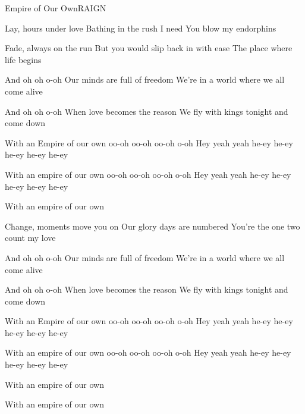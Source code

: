 \documentclass[a4paper,11pt,french]{article}
\begin{document}
\begin{Song}{Empire of Our Own}{RAIGN}
\begin{multicols}{2}

\begin{Verse}
Lay, hours under love
Bathing in the rush I need
You blow my endorphins
\espaceInterStrophe

Fade, always on the run
But you would slip back in with ease
The place where life begins
\end{Verse}
\espaceInterStrophe

\begin{PreChorus}
And oh oh o-oh
Our minds are full of freedom
We're in a world where we all come alive
\espaceInterStrophe

And oh oh o-oh
When love becomes the reason
We fly with kings tonight and come down
\end{PreChorus}
\espaceInterStrophe

\begin{Chorus}
With an Empire of our own
oo-oh oo-oh oo-oh o-oh 
Hey yeah yeah
he-ey he-ey he-ey he-ey he-ey 
\espaceInterStrophe

With an empire of our own
oo-oh oo-oh oo-oh o-oh 
Hey yeah yeah
he-ey he-ey he-ey he-ey he-ey
\espaceInterStrophe

With an empire of our own
\end{Chorus}
\columnbreak

\begin{Verse}
Change, moments move you on
Our glory days are numbered
You're the one two count my love
\end{Verse}
\espaceInterStrophe

\begin{PreChorus}
And oh oh o-oh
Our minds are full of freedom
We're in a world where we all come alive
\espaceInterStrophe

And oh oh o-oh
When love becomes the reason
We fly with kings tonight and come down
\end{PreChorus}
\espaceInterStrophe

\begin{Chorus}
With an Empire of our own
oo-oh oo-oh oo-oh o-oh 
Hey yeah yeah
he-ey he-ey he-ey he-ey he-ey 
\espaceInterStrophe

With an empire of our own
oo-oh oo-oh oo-oh o-oh 
Hey yeah yeah
he-ey he-ey he-ey he-ey he-ey 
\espaceInterStrophe

With an empire of our own
\espaceInterStrophe

With an empire of our own
\end{Chorus}
\vfill
~



\end{multicols}
\end{Song}
\end{document}
